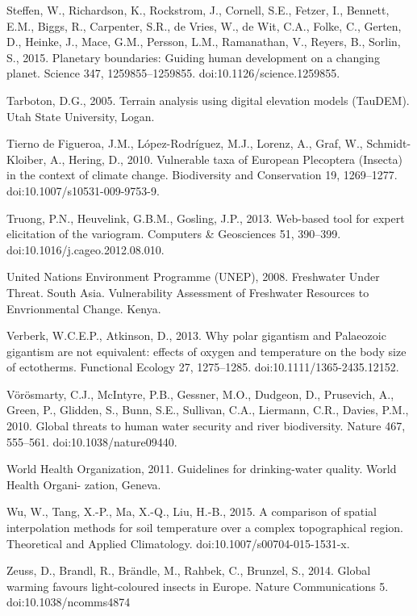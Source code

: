 \begin{thebibliography}
\bibitem{} \hangindent=1cm Steffen, W., Richardson, K., Rockstrom, J., Cornell, S.E., Fetzer, I., Bennett, E.M., Biggs, R., Carpenter, S.R., de Vries, W., de Wit, C.A., Folke, C., Gerten, D., Heinke, J., Mace, G.M., Persson, L.M., Ramanathan, V., Reyers, B., Sorlin, S., 2015. Planetary boundaries: Guiding human development on a changing planet. Science 347, 1259855–1259855. doi:10.1126/science.1259855.

\bibitem{} \hangindent=1cm Tarboton, D.G., 2005. Terrain analysis using digital elevation models (TauDEM). Utah State University, Logan.

\bibitem{} \hangindent=1cm Tierno de Figueroa, J.M., López-Rodríguez, M.J., Lorenz, A., Graf, W., Schmidt-Kloiber, A., Hering, D., 2010. Vulnerable taxa of European Plecoptera (Insecta) in the context of climate change. Biodiversity and Conservation 19, 1269–1277. doi:10.1007/s10531-009-9753-9.

\bibitem{} \hangindent=1cm Truong, P.N., Heuvelink, G.B.M., Gosling, J.P., 2013. Web-based tool for expert elicitation of the variogram. Computers & Geosciences 51, 390–399. doi:10.1016/j.cageo.2012.08.010.

\bibitem{} \hangindent=1cm United Nations Environment Programme (UNEP), 2008. Freshwater Under Threat. South Asia. Vulnerability Assessment of Freshwater Resources to Envrionmental Change. Kenya.

\bibitem{} \hangindent=1cm Verberk, W.C.E.P., Atkinson, D., 2013. Why polar gigantism and Palaeozoic gigantism are not equivalent: effects of oxygen and temperature on the body size of ectotherms. Functional Ecology 27, 1275–1285. doi:10.1111/1365-2435.12152.

\bibitem{} \hangindent=1cm Vörösmarty, C.J., McIntyre, P.B., Gessner, M.O., Dudgeon, D., Prusevich, A., Green, P., Glidden, S., Bunn, S.E., Sullivan, C.A., Liermann, C.R., Davies, P.M., 2010. Global threats to human water security and river biodiversity. Nature 467, 555–561. doi:10.1038/nature09440.

\bibitem{} \hangindent=1cm World Health Organization, 2011. Guidelines for drinking-water quality. World Health Organi- zation, Geneva.

\bibitem{} \hangindent=1cm Wu, W., Tang, X.-P., Ma, X.-Q., Liu, H.-B., 2015. A comparison of spatial interpolation methods for soil temperature over a complex topographical region. Theoretical and Applied Climatology. doi:10.1007/s00704-015-1531-x.

\bibitem{} \hangindent=1cm Zeuss, D., Brandl, R., Brändle, M., Rahbek, C., Brunzel, S., 2014. Global warming favours light-coloured insects in Europe. Nature Communications 5. doi:10.1038/ncomms4874

\end{thebibliography}

\endgroup

\openright